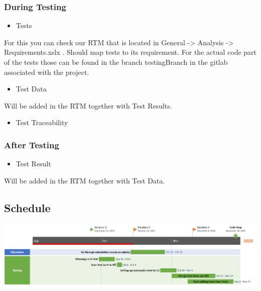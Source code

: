 \subsubsection{During Testing}
\begin{itemize}
    \item Tests
\end{itemize}
For this you can check our RTM that is located in General -> Analysis -> Requirements.xslx . Should map tests to its requirement. For the actual code part of the tests those can be found in the branch testingBranch in the gitlab associated with the project. 
\begin{itemize}
    
    \item{Test Data}
\end{itemize}
Will be added in the RTM together with Test Results.
\begin{itemize}

    \item{Test Traceability}

\end{itemize}
\subsubsection{After Testing}
\begin{itemize}
    \item Test Result
  
\end{itemize}
Will be added in the RTM together with Test Data.
\subsection{Schedule}
\vfill
\includegraphics[width=\linewidth]{Pictures/TestSchedule.PNG}

    \vfill
    \clearpage
